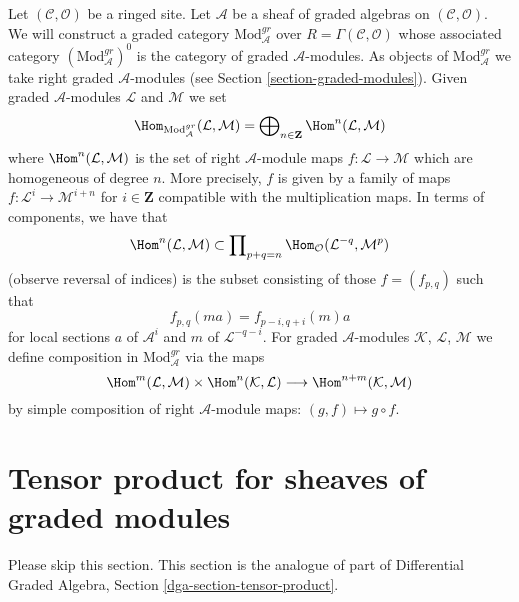 \medskip\noindent
Let $(\mathcal{C}, \mathcal{O})$ be a ringed site.
Let $\mathcal{A}$ be a sheaf of graded algebras
on $(\mathcal{C}, \mathcal{O})$. We will construct
a graded category $\text{Mod}^{gr}_\mathcal{A}$ over
$R = \Gamma(\mathcal{C}, \mathcal{O})$
whose associated category $(\text{Mod}^{gr}_\mathcal{A})^0$
is the category of graded $\mathcal{A}$-modules. As objects
of $\text{Mod}^{gr}_\mathcal{A}$ we take right graded
$\mathcal{A}$-modules (see
Section \ref{section-graded-modules}). Given graded
$\mathcal{A}$-modules $\mathcal{L}$ and $\mathcal{M}$ we set
$$
\Hom_{\text{Mod}^{gr}_\mathcal{A}}(\mathcal{L}, \mathcal{M}) =
\bigoplus\nolimits_{n \in \mathbf{Z}} \Hom^n(\mathcal{L}, \mathcal{M})
$$
where
$\Hom^n(\mathcal{L}, \mathcal{M})$
is the set of right $\mathcal{A}$-module maps
$f : \mathcal{L} \to \mathcal{M}$ which
are homogeneous of degree $n$. More precisely, $f$ is given
by a family of maps $f : \mathcal{L}^i \to \mathcal{M}^{i + n}$
for $i \in \mathbf{Z}$ compatible with the multiplication
maps. In terms of components, we have that
$$
\Hom^n(\mathcal{L}, \mathcal{M})
\subset
\prod\nolimits_{p + q = n}
\Hom_\mathcal{O}(\mathcal{L}^{-q}, \mathcal{M}^p)
$$
(observe reversal of indices) is the subset consisting of those
$f = (f_{p, q})$ such that
$$
f_{p, q}(m a) = f_{p - i, q + i}(m)a
$$
for local sections $a$ of $\mathcal{A}^i$ and
$m$ of $\mathcal{L}^{-q - i}$. For graded $\mathcal{A}$-modules
$\mathcal{K}$, $\mathcal{L}$, $\mathcal{M}$
we define composition in $\text{Mod}^{gr}_\mathcal{A}$ via
the maps
$$
\Hom^m(\mathcal{L}, \mathcal{M}) \times
\Hom^n(\mathcal{K}, \mathcal{L}) \longrightarrow
\Hom^{n + m}(\mathcal{K}, \mathcal{M})
$$
by simple composition of right
$\mathcal{A}$-module maps: $(g, f) \mapsto g \circ f$.





\section{Tensor product for sheaves of graded modules}
\label{section-tensor-product}

\noindent
Please skip this section. This section is the analogue of part of
Differential Graded Algebra, Section \ref{dga-section-tensor-product}.

